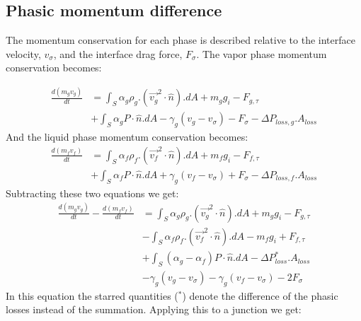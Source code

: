 \documentclass[11pt,letterpaper,titlepage]{article}
\begin{document}
\vspace{1cm}
\subsection{Phasic momentum difference}
The momentum conservation for each phase is described relative to the interface velocity, $v_{\sigma}$, and the interface drag force, $F_{\sigma}$. The vapor phase momentum conservation becomes:

\begin{equation*}
\begin{aligned}
\frac{d(m_gv_g)}{dt}
&=\int_S \alpha_g\rho_g. (\vec{v_g}^2\cdot \hat{n}).dA +m_gg_i-F_{g,\tau}\\
&+\int_S\alpha_g P\cdot \hat{n}.dA - \gamma_g (v_g - v_{\sigma})-F_{\sigma}- \Delta P_{loss,g}.A_{loss}
\end{aligned}
\end{equation*}
\newline
\noindent And the liquid phase momentum conservation becomes:
\begin{equation*}
\begin{aligned}
\frac{d(m_fv_f)}{dt}
&=\int_S \alpha_f\rho_f. (\vec{v_f}^2\cdot \hat{n}).dA +m_fg_i-F_{f,\tau}\\
&+\int_S\alpha_f P\cdot \hat{n}.dA + \gamma_g (v_f - v_{\sigma})+F_{\sigma}- \Delta P_{loss,f}.A_{loss}
\end{aligned}
\end{equation*}
\noindent Subtracting these two equations we get:
\begin{equation*}
\begin{aligned}
\frac{d(m_gv_g)}{dt}-\frac{d(m_fv_f)}{dt}
&=\int_S \alpha_g\rho_g. (\vec{v_g}^2\cdot \hat{n}).dA +m_gg_i-F_{g,\tau}\\
&-\int_S \alpha_f\rho_f. (\vec{v_f}^2\cdot \hat{n}).dA -m_fg_i+F_{f,\tau}\\
&+\int_S (\alpha_g-\alpha_f)P\cdot \hat{n}.dA - \Delta P_{loss}^*.A_{loss}\\
&- \gamma_g (v_g - v_{\sigma})- \gamma_g (v_f - v_{\sigma})-2F_{\sigma}
\end{aligned}
\end{equation*}
\newline
\noindent In this equation the starred quantities ($^*$) denote the difference of the phasic losses instead of the summation. Applying this to a junction we get:
\end{document}
